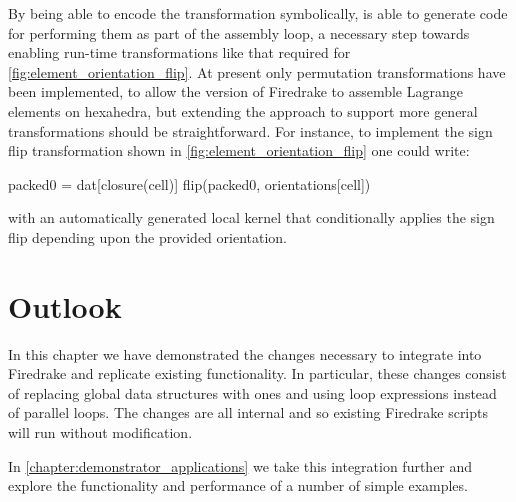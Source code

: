 \documentclass[thesis]{subfiles}
\begin{document}
By being able to encode the transformation symbolically,  is able to generate code for performing them as part of the assembly loop, a necessary step towards enabling run-time transformations like that required for \cref{fig:element_orientation_flip}.
At present only permutation transformations have been implemented, to allow the  version of Firedrake to assemble Lagrange elements on hexahedra, but extending the approach to support more general transformations should be straightforward.
For instance, to implement the sign flip transformation shown in \cref{fig:element_orientation_flip} one could write:
\begin{pyinline}
  packed0 = dat[closure(cell)]
  flip(packed0, orientations[cell])
\end{pyinline}
with  an automatically generated local kernel that conditionally applies the sign flip depending upon the provided orientation.

\section{Outlook}

In this chapter we have demonstrated the changes necessary to integrate  into Firedrake and replicate existing  functionality.
In particular, these changes consist of replacing  global data structures with  ones and using  loop expressions instead of  parallel loops.
The changes are all internal and so existing Firedrake scripts will run without modification.

In \cref{chapter:demonstrator_applications} we take this integration further and explore the functionality and performance of a number of simple examples.
\end{document}
